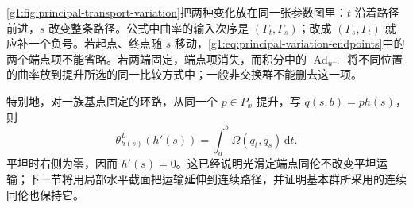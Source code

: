 

\cref{g1:fig:principal-transport-variation}把两种变化放在同一张参数图里：\(t\) 沿着路径前进，\(s\) 改变整条路径。公式中曲率的输入次序是 \((\Gamma_t,\Gamma_s)\)；改成 \((\Gamma_s,\Gamma_t)\) 就应补一个负号。若起点、终点随 \(s\) 移动，\eqref{g1:eq:principal-variation-endpoints}中的两个端点项不能省略。若两端固定，端点项消失，而积分中的 \(\operatorname{Ad}_{u^{-1}}\) 将不同位置的曲率放到提升所选的同一比较方式中；一般非交换群不能删去这一项。

\ProseParagraphBreak

特别地，对一族基点固定的环路，从同一个 \(p\in P_x\) 提升，写 \(q(s,b)=p h(s)\)，则
\[
	\theta^L_{h(s)}(h'(s))=\int_a^b\Omega(q_t,q_s)\,\mathrm{d}t.
\]
平坦时右侧为零，因而 \(h'(s)=0\)。这已经说明光滑定端点同伦不改变平坦运输；下一节将用局部水平截面把运输延伸到连续路径，并证明基本群所采用的连续同伦也保持它。

